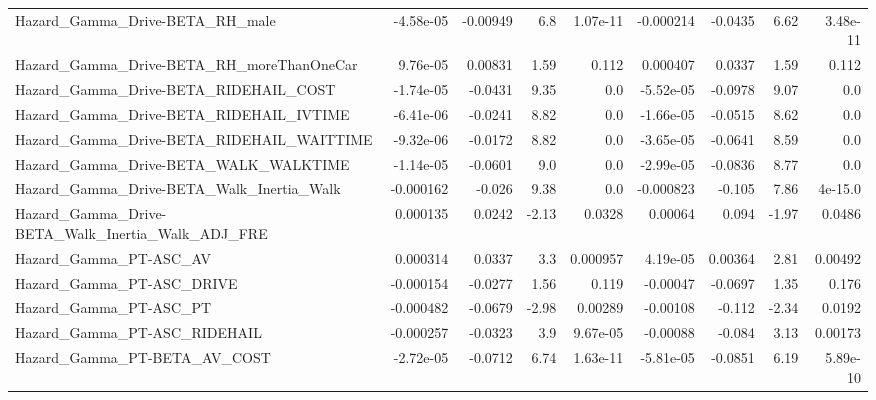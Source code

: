 \begin{tabular}{lrrrrrrrr}
Hazard\_Gamma\_Drive-BETA\_RH\_male                    &   -4.58e-05 &     -0.00949 &      6.8 & 1.07e-11 &  -0.000214 &     -0.0435 &         6.62 &      3.48e-11 \\
Hazard\_Gamma\_Drive-BETA\_RH\_moreThanOneCar          &    9.76e-05 &      0.00831 &     1.59 &    0.112 &   0.000407 &      0.0337 &         1.59 &         0.112 \\
Hazard\_Gamma\_Drive-BETA\_RIDEHAIL\_COST              &   -1.74e-05 &      -0.0431 &     9.35 &      0.0 &  -5.52e-05 &     -0.0978 &         9.07 &           0.0 \\
Hazard\_Gamma\_Drive-BETA\_RIDEHAIL\_IVTIME            &   -6.41e-06 &      -0.0241 &     8.82 &      0.0 &  -1.66e-05 &     -0.0515 &         8.62 &           0.0 \\
Hazard\_Gamma\_Drive-BETA\_RIDEHAIL\_WAITTIME          &   -9.32e-06 &      -0.0172 &     8.82 &      0.0 &  -3.65e-05 &     -0.0641 &         8.59 &           0.0 \\
Hazard\_Gamma\_Drive-BETA\_WALK\_WALKTIME              &   -1.14e-05 &      -0.0601 &      9.0 &      0.0 &  -2.99e-05 &     -0.0836 &         8.77 &           0.0 \\
Hazard\_Gamma\_Drive-BETA\_Walk\_Inertia\_Walk          &   -0.000162 &       -0.026 &     9.38 &      0.0 &  -0.000823 &      -0.105 &         7.86 &       4e-15.0 \\
Hazard\_Gamma\_Drive-BETA\_Walk\_Inertia\_Walk\_ADJ\_FRE  &    0.000135 &       0.0242 &    -2.13 &   0.0328 &    0.00064 &       0.094 &        -1.97 &        0.0486 \\
Hazard\_Gamma\_PT-ASC\_AV                             &    0.000314 &       0.0337 &      3.3 & 0.000957 &   4.19e-05 &     0.00364 &         2.81 &       0.00492 \\
Hazard\_Gamma\_PT-ASC\_DRIVE                          &   -0.000154 &      -0.0277 &     1.56 &    0.119 &   -0.00047 &     -0.0697 &         1.35 &         0.176 \\
Hazard\_Gamma\_PT-ASC\_PT                             &   -0.000482 &      -0.0679 &    -2.98 &  0.00289 &   -0.00108 &      -0.112 &        -2.34 &        0.0192 \\
Hazard\_Gamma\_PT-ASC\_RIDEHAIL                       &   -0.000257 &      -0.0323 &      3.9 & 9.67e-05 &   -0.00088 &      -0.084 &         3.13 &       0.00173 \\
Hazard\_Gamma\_PT-BETA\_AV\_COST                       &   -2.72e-05 &      -0.0712 &     6.74 & 1.63e-11 &  -5.81e-05 &     -0.0851 &         6.19 &      5.89e-10 \\

\end{tabular}
